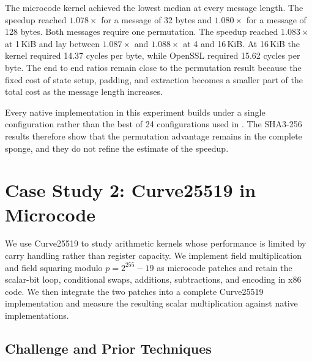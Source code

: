 \documentclass[journal=tches,submission]{iacrtrans}
\makeatletter
\renewcommand\paragraph{\@startsection{paragraph}{4}{\z@}%
      {1.75ex \@plus .3ex \@minus .2ex}%
      {-1em}%
      {\normalfont\normalsize\bfseries\SS@parafont}}
\makeatother
\begin{document}
The microcode kernel achieved the lowest median at every message length. 
The speedup reached $1.078\times$ for a message of 32 bytes and $1.080\times$ for a message of 128 bytes. 
Both messages require one permutation. 
The speedup reached $1.083\times$ at 1\,KiB and lay between $1.087\times$ and $1.088\times$ at 4 and 16\,KiB. At 16\,KiB the kernel
required 14.37 cycles per byte, while OpenSSL required 15.62 cycles per byte. 
The end to end ratios remain close to the permutation result
because the fixed cost of state setup, padding, and extraction becomes a smaller
part of the total cost as the message length increases.

Every native implementation in this experiment builds under a single
configuration rather than the best of 24 configurations used in
. 
The SHA3-256 results therefore show that the permutation advantage remains in the complete sponge, and they do not refine the
estimate of the speedup.


\section{Case Study 2: Curve25519 in Microcode}
\label{sec:curve25519}
We use Curve25519 to study arithmetic kernels whose performance is limited by carry handling rather than register capacity.
We implement field multiplication and field squaring modulo $p=2^{255}-19$ as microcode patches and retain the scalar-bit loop, conditional swaps, additions, subtractions, and encoding in x86 code.
We then integrate the two patches into a complete Curve25519 implementation and measure the resulting scalar multiplication against native implementations.

\subsection{Challenge and Prior Techniques}
\label{sec:c25519-challenge}
\end{document}
